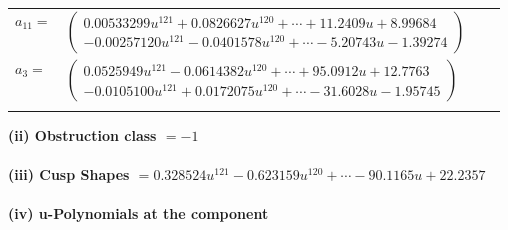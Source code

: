 \documentclass[1p]{elsarticle_modified}
\theoremstyle{definition}
\begin{document}
\begin{tabular}{m{7pt} m{180pt} m{7pt} m{180pt} }
\flushright $a_{11}=$&$\begin{pmatrix}0.00533299 u^{121}+0.0826627 u^{120}+\cdots+11.2409 u+8.99684\\-0.00257120 u^{121}-0.0401578 u^{120}+\cdots-5.20743 u-1.39274\end{pmatrix}$ \\
\flushright $a_{3}=$&$\begin{pmatrix}0.0525949 u^{121}-0.0614382 u^{120}+\cdots+95.0912 u+12.7763\\-0.0105100 u^{121}+0.0172075 u^{120}+\cdots-31.6028 u-1.95745\end{pmatrix}$\\&\end{tabular}
\flushleft \textbf{(ii) Obstruction class $= -1$}\\~\\
\flushleft \textbf{(iii) Cusp Shapes $= 0.328524 u^{121}-0.623159 u^{120}+\cdots-90.1165 u+22.2357$}\\~\\
\newpage\renewcommand{\arraystretch}{1}
\flushleft \textbf{(iv) u-Polynomials at the component}\newline \\
\end{document}
